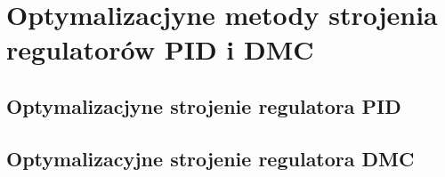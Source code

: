 \chapter{Optymalizacjyne metody strojenia regulatorów PID i DMC}
\label{zad6}

\section{Optymalizacjyne strojenie regulatora PID}
\label{zad6_pid}

\section{Optymalizacyjne strojenie regulatora DMC}
\label{zad6_dmc}
